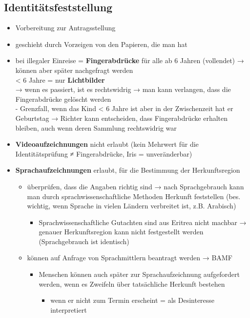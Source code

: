 \documentclass[
]{article}
\providecommand{\tightlist}{%
  \setlength{\itemsep}{0pt}\setlength{\parskip}{0pt}}
\begin{document}
\hypertarget{identituxe4tsfeststellung}{%
\subsection{Identitätsfeststellung}\label{identituxe4tsfeststellung}}

\begin{itemize}
\tightlist
\item
  Vorbereitung zur Antragsstellung
\item
  geschieht durch Vorzeigen von den Papieren, die man hat
\item
  bei illegaler Einreise = \textbf{Fingerabdrücke} für alle ab 6 Jahren
  (vollendet) → können aber später nachgefragt werden\\
  \textless{} 6 Jahre = nur \textbf{Lichtbilder}\\
  → wenn es passiert, ist es rechtswidrig → man kann verlangen, dass die
  Fingerabdrücke gelöscht werden\\
  - Grenzfall, wenn das Kind \textless{} 6 Jahre ist aber in der
  Zwischenzeit hat er Geburtstag → Richter kann entscheiden, dass
  Fingerabdrücke erhalten bleiben, auch wenn deren Sammlung rechtswidrig
  war
\item
  \textbf{Videoaufzeichnungen} nicht erlaubt (kein Mehrwert für die
  Identitätsprüfung ≠ Fingerabdrücke, Iris = unveränderbar)
\item
  \textbf{Sprachaufzeichnungen} erlaubt, für die Bestimmung der
  Herkunftsregion

  \begin{itemize}
  \tightlist
  \item
    überprüfen, dass die Angaben richtig sind → nach Sprachgebrauch kann
    man durch sprachwissenschaftliche Methoden Herkunft feststellen
    (bes. wichtig, wenn Sprache in vielen Ländern verbreitet ist, z.B.
    Arabisch)

    \begin{itemize}
    \tightlist
    \item
      Sprachwissenschaftliche Gutachten sind aus Eritrea nicht machbar →
      genauer Herkunftsregion kann nicht festgestellt werden
      (Sprachgebrauch ist identisch)
    \end{itemize}
  \item
    können auf Anfrage von Sprachmittlern beantragt werden → BAMF

    \begin{itemize}
    \tightlist
    \item
      Menschen können auch später zur Sprachaufzeichnung aufgefordert
      werden, wenn es Zweifeln über tatsächliche Herkunft bestehen

      \begin{itemize}
      \tightlist
      \item
        wenn er nicht zum Termin erscheint = als Desinteresse
        interpretiert
      \end{itemize}
    \end{itemize}
  \end{itemize}
\end{itemize}
\end{document}
